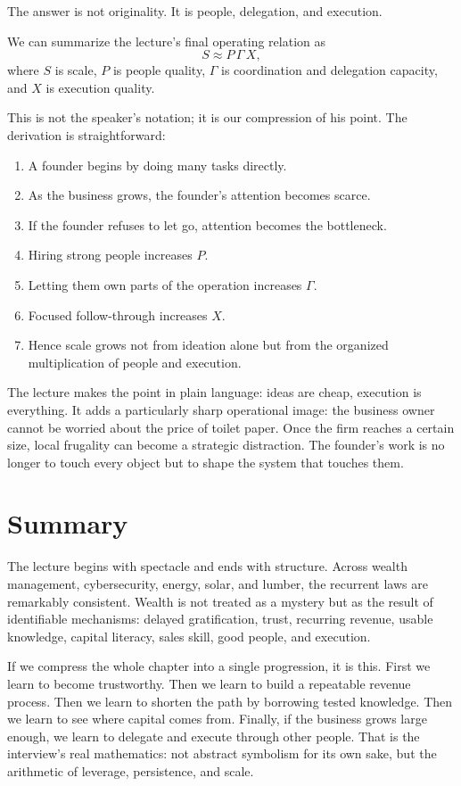 The answer is not originality. It is people, delegation, and execution.

We can summarize the lecture's final operating relation as
\begin{equation}
S \approx P\,\Gamma\,X,
\end{equation}
where \(S\) is scale, \(P\) is people quality, \(\Gamma\) is coordination and delegation capacity, and \(X\) is execution quality.

This is not the speaker's notation; it is our compression of his point. The derivation is straightforward:
\begin{enumerate}
\item A founder begins by doing many tasks directly.
\item As the business grows, the founder's attention becomes scarce.
\item If the founder refuses to let go, attention becomes the bottleneck.
\item Hiring strong people increases \(P\).
\item Letting them own parts of the operation increases \(\Gamma\).
\item Focused follow-through increases \(X\).
\item Hence scale grows not from ideation alone but from the organized multiplication of people and execution.
\end{enumerate}

The lecture makes the point in plain language: ideas are cheap, execution is everything. It adds a particularly sharp operational image: the business owner cannot be worried about the price of toilet paper. Once the firm reaches a certain size, local frugality can become a strategic distraction. The founder's work is no longer to touch every object but to shape the system that touches them.

\section{Summary}

The lecture begins with spectacle and ends with structure. Across wealth management, cybersecurity, energy, solar, and lumber, the recurrent laws are remarkably consistent. Wealth is not treated as a mystery but as the result of identifiable mechanisms: delayed gratification, trust, recurring revenue, usable knowledge, capital literacy, sales skill, good people, and execution.

If we compress the whole chapter into a single progression, it is this. First we learn to become trustworthy. Then we learn to build a repeatable revenue process. Then we learn to shorten the path by borrowing tested knowledge. Then we learn to see where capital comes from. Finally, if the business grows large enough, we learn to delegate and execute through other people. That is the interview's real mathematics: not abstract symbolism for its own sake, but the arithmetic of leverage, persistence, and scale.